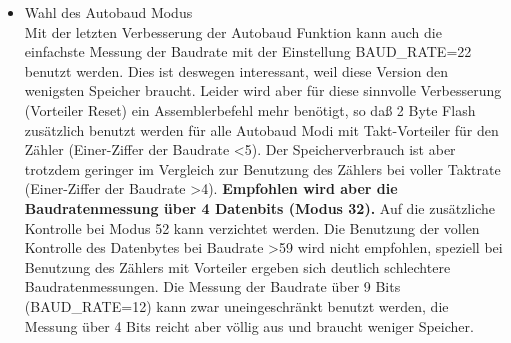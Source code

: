 \begin{itemize}
\item{Wahl des Autobaud Modus} \\
Mit der letzten Verbesserung der Autobaud Funktion kann auch die einfachste Messung der Baudrate mit
der Einstellung BAUD\_RATE=22 benutzt werden. Dies ist deswegen interessant, weil diese Version
den wenigsten Speicher braucht. Leider wird aber für diese sinnvolle Verbesserung (Vorteiler Reset)
ein Assemblerbefehl mehr benötigt, so daß 2 Byte Flash zusätzlich benutzt werden für alle Autobaud Modi
mit Takt-Vorteiler für den Zähler (Einer-Ziffer der Baudrate \textless 5).
Der Speicherverbrauch ist aber trotzdem geringer im Vergleich zur Benutzung des Zählers bei voller Taktrate
(Einer-Ziffer der Baudrate \textgreater 4).
\textbf{Empfohlen wird aber die Baudratenmessung über 4 Datenbits (Modus 32).} Auf die zusätzliche Kontrolle
bei Modus 52 kann verzichtet werden. 
Die Benutzung der vollen Kontrolle des Datenbytes bei Baudrate \textgreater 59 wird nicht empfohlen,
speziell bei Benutzung des Zählers mit Vorteiler ergeben sich deutlich schlechtere Baudratenmessungen.
Die Messung der Baudrate über 9 Bits (BAUD\_RATE=12) kann zwar uneingeschränkt benutzt werden,
die Messung über 4 Bits reicht aber völlig aus und braucht weniger Speicher.


\end{itemize}
